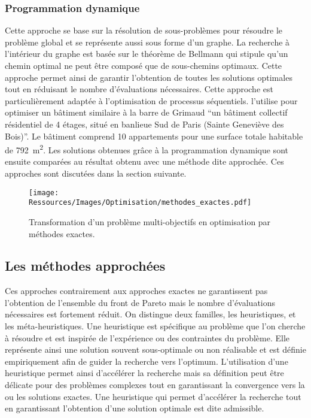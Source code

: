 \subsubsection{Programmation dynamique} %
\label{ssub:programmation_dynamique}
Cette approche se base sur la résolution de sous-problèmes pour résoudre le
problème global et se représente aussi sous forme d’un graphe. La recherche à
l’intérieur du graphe est basée sur le théorème de Bellmann qui stipule qu’un
chemin optimal ne peut être composé que de sous-chemins optimaux. Cette approche
permet ainsi de garantir l’obtention de toutes les solutions optimales tout en
réduisant le nombre d’évaluations nécessaires. Cette approche est
particulièrement adaptée à l’optimisation de processus séquentiels.
\textcite{Rivallain2013} l’utilise pour optimiser un bâtiment similaire à la
barre de Grimaud \enquote{un bâtiment collectif résidentiel de 4 étages, situé en banlieue Sud
de Paris (Sainte Geneviève des Bois)}. Le bâtiment comprend 10 appartements pour
une surface totale habitable de \SI{792}{\meter\squared}. Les solutions obtenues
grâce à la programmation dynamique sont ensuite comparées au résultat obtenu avec
une méthode dite approchée. Ces approches sont discutées dans la section suivante.

\begin{figure}
    \centering
    \texttt{[image: Ressources/Images/Optimisation/methodes\_exactes.pdf]}
    \caption[Transformation d’un problème multi-objectifs en optimisation par méthodes exactes]
            {Transformation d’un problème multi-objectifs en optimisation par méthodes exactes.}
    \label{fig:multi_exactes}
\end{figure}



\subsection{Les méthodes approchées} %
\label{sub:les_methodes_approchees}
Ces approches contrairement aux approches exactes ne garantissent pas
l’obtention de l’ensemble du front de Pareto mais le nombre d’évaluations
nécessaires est fortement réduit. On distingue deux familles, les heuristiques,
et les méta-heuristiques. Une heuristique est spécifique au problème que l’on
cherche à résoudre et est inspirée de l’expérience ou des contraintes du
problème. Elle représente ainsi une solution souvent sous-optimale ou non
réalisable et est définie empiriquement afin de guider la recherche vers
l’optimum. L’utilisation d’une heuristique permet ainsi d’accélérer la recherche
mais sa définition peut être délicate pour des problèmes complexes tout en
garantissant la convergence vers la ou les solutions exactes. Une heuristique
qui permet d’accélérer la recherche tout en garantissant l’obtention d’une
solution optimale est dite admissible.

